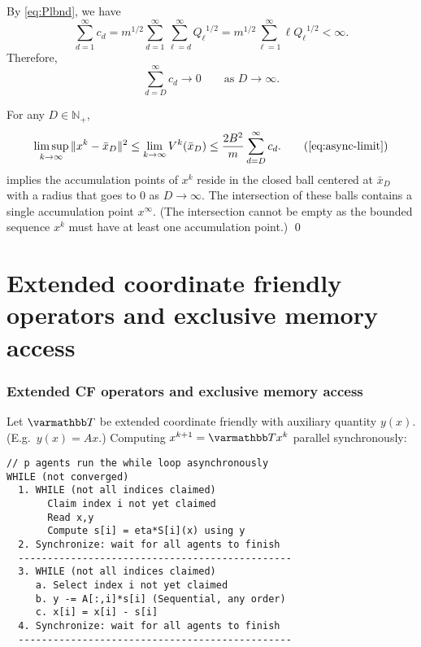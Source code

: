 \documentclass[10pt,mathserif]{beamer}
\begin{document}
\begin{frame}
By \eqref{eq:Plbnd}, we have
\[
\sum^\infty_{d=1}c_d= {m}^{1/2}\sum^\infty_{d=1}\sum_{\ell=d}^{\infty} {Q_\ell}^{1/2}
=m^{1/2}\sum^\infty_{\ell=1}\ell {Q_\ell}^{1/2}<\infty.
\]
Therefore,
\[
\sum^\infty_{d=D}c_d\rightarrow 0\qquad\text{as $D\rightarrow\infty$.}
\]

For any $D\in \mathbb{N}_+$,
\begin{equation}
\limsup_{k\rightarrow\infty}\|x^k-\bar{x}_D\|^2\le 
\lim_{k\rightarrow\infty}V^{k}(\bar{x}_D)\le
\frac{2B^2}{m}\sum^\infty_{d=D}c_d .
\tag{\ref{eq:async-limit}}
\end{equation}
implies the accumulation points of $x^k$ reside in the closed ball centered at $\bar{x}_D$ with a radius that goes to $0$ as $D\rightarrow\infty$. The intersection of these balls contains a single accumulation point $x^\infty$.
(The intersection cannot be empty as the bounded sequence $x^k$ must have at least one accumulation point.)
\qed
    
\end{frame}



\section{Extended coordinate friendly operators and exclusive memory access}

\begin{frame}[fragile]
\frametitle{Extended CF operators and exclusive memory access}
Let $\opT$ be extended coordinate friendly with auxiliary quantity $y(x)$.\\
(E.g.\ $y(x)=Ax$.)
Computing $x^{k+1} = \opT x^k$ parallel synchronously:
% 
\begin{lstlisting}
// p agents run the while loop asynchronously
WHILE (not converged)
  1. WHILE (not all indices claimed)
       Claim index i not yet claimed
       Read x,y
       Compute s[i] = eta*S[i](x) using y 
  2. Synchronize: wait for all agents to finish
  -----------------------------------------------
  3. WHILE (not all indices claimed)
     a. Select index i not yet claimed
     b. y -= A[:,i]*s[i] (Sequential, any order)
     c. x[i] = x[i] - s[i]
  4. Synchronize: wait for all agents to finish
  -----------------------------------------------
\end{lstlisting}
\end{frame}
\end{document}
